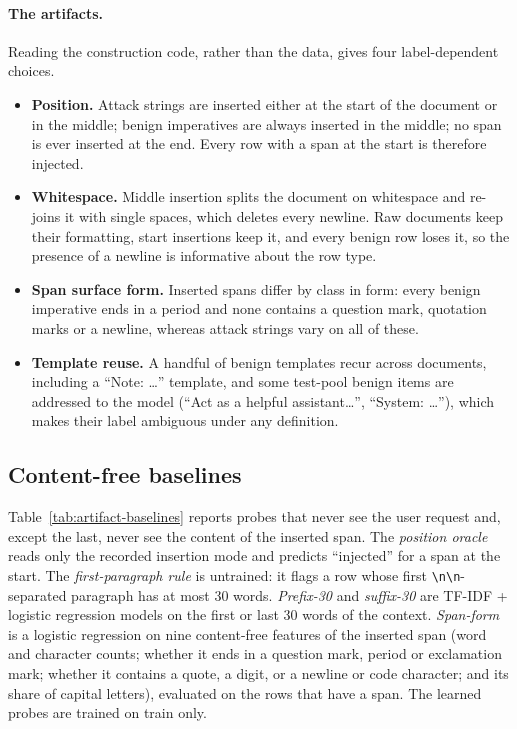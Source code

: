 \paragraph{The artifacts.}
Reading the construction code, rather than the data, gives four label-dependent choices.
\begin{itemize}
  \item \textbf{Position.} Attack strings are inserted either at the start of the document or in the middle;
  benign imperatives are always inserted in the middle; no span is ever inserted at the end. Every row with a span at
  the start is therefore injected.
  \item \textbf{Whitespace.} Middle insertion splits the document on whitespace and re-joins it with single spaces,
  which deletes every newline. Raw documents keep their formatting, start insertions keep it, and every benign row
  loses it, so the presence of a newline is informative about the row type.
  \item \textbf{Span surface form.} Inserted spans differ by class in form: every benign imperative ends in a period
  and none contains a question mark, quotation marks or a newline, whereas attack strings vary on all of these.
  \item \textbf{Template reuse.} A handful of benign templates recur across documents, including a ``Note: \ldots''
  template, and some test-pool benign items are addressed to the model (``Act as a helpful assistant\ldots'',
  ``System: \ldots''), which makes their label ambiguous under any definition.
\end{itemize}

\subsection{Content-free baselines}
\label{sec:artifacts:baselines}
Table~\ref{tab:artifact-baselines} reports probes that never see the user request and, except the last, never see
the content of the inserted span. The \emph{position oracle} reads only the recorded insertion mode and predicts
``injected'' for a span at the start. The \emph{first-paragraph rule} is untrained: it flags a row whose first
\verb|\n\n|-separated paragraph has at most 30 words. \emph{Prefix-30} and \emph{suffix-30} are TF-IDF + logistic
regression models on the first or last 30 words of the context. \emph{Span-form} is a logistic regression on nine
content-free features of the inserted span (word and character counts; whether it ends in a question mark,
period or exclamation mark; whether it contains a quote, a digit, or a newline or code character; and its share of
capital letters),
evaluated on the rows that have a span. The learned probes are trained on \vtwo{} train only.

